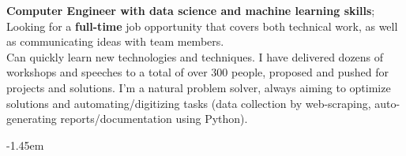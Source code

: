 \documentclass[10pt,a4paper,ragged2e]{altacv}
\begin{document}



\begin{fullwidth}
  \makecvheader

  \textbf{Computer Engineer with data science and machine learning skills}; Looking for a \textbf{full-time} job opportunity that covers both technical work, as well as communicating ideas with team members.\\

  Can quickly learn new technologies and techniques.
  I have delivered dozens of workshops and speeches to a total of over 300 people, proposed and pushed for projects and solutions.
  \smallskip
  I'm a natural problem solver, always aiming to optimize solutions and automating/digitizing tasks (data collection by web-scraping, auto-generating reports/documentation using Python).

\end{fullwidth}



{}
\kern-1.45em %


\verbose{}{}


\verbose{}{}
\end{document}

